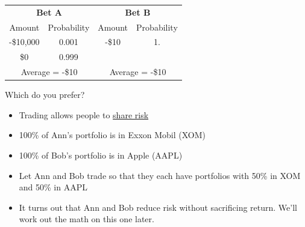\documentclass{beamer}
\begin{document}
\begin{frame}{}
	\begin{center}
		\renewcommand{\arraystretch}{1.5}
		\begin{tabular}{cc|cc}
			\multicolumn{2}{c}{\textbf{Bet A}} & \multicolumn{2}{c}{\textbf{Bet B}} \\
			Amount & Probability & Amount & Probability \\ \hline
			-\$10,000 & 0.001 & -\$10 & 1. \\
			\$0 & 0.999 & & \\ \hline
			\multicolumn{2}{c}{Average = -\$10} & \multicolumn{2}{c}{Average = -\$10}
		\end{tabular}
	\end{center}
\begin{center}
Which do you prefer?
\end{center}
\end{frame}

\begin{frame}{}
	\begin{itemize}
		\item Trading allows people to \underline{share risk}
		\item 100\% of Ann’s portfolio is in Exxon Mobil (XOM)
		\item 100\% of Bob’s portfolio is in Apple (AAPL)
		\item Let Ann and Bob trade so that they each have portfolios with 50\% in XOM and 50\% in AAPL
		\item It turns out that Ann and Bob reduce risk without sacrificing return. We’ll work out the math on this one later.
	\end{itemize}
\end{frame}
\end{document}
